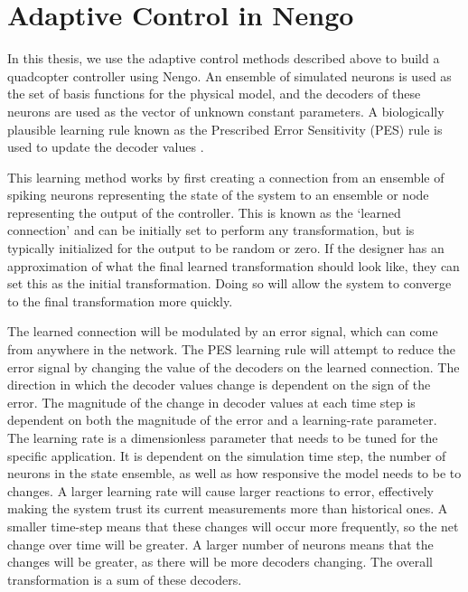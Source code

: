 \documentclass[letterpaper,12pt,titlepage,oneside,final]{book}
\begin{document}
\section{Adaptive Control in Nengo}


In this thesis, we use the adaptive control methods described above to build a quadcopter controller using Nengo. 
An ensemble of simulated neurons is used as the set of basis functions for the physical model, and the decoders of these neurons are used as the vector of unknown constant parameters. 
A biologically plausible learning rule known as the Prescribed Error Sensitivity (PES) rule is used to update the decoder values \cite{bekolay2013simultaneous}. 

This learning method works by first creating a connection from an ensemble of spiking neurons representing the state of the system to an ensemble or node representing the output of the controller. 
This is known as the `learned connection' and can be initially set to perform any transformation, but is typically initialized for the output to be random or zero. 
If the designer has an approximation of what the final learned transformation should look like, they can set this as the initial transformation. 
Doing so will allow the system to converge to the final transformation more quickly.

The learned connection will be modulated by an error signal, which can come from anywhere in the network. 
The PES learning rule will attempt to reduce the error signal by changing the value of the decoders on the learned connection. 
The direction in which the decoder values change is dependent on the sign of the error. 
The magnitude of the change in decoder values at each time step is dependent on both the magnitude of the error and a learning-rate parameter. 
The learning rate is a dimensionless parameter that needs to be tuned for the specific application. 
It is dependent on the simulation time step, the number of neurons in the state ensemble, as well as how responsive the model needs to be to changes. 
A larger learning rate will cause larger reactions to error, effectively making the system trust its current measurements more than historical ones. 
A smaller time-step means that these changes will occur more frequently, so the net change over time will be greater. 
A larger number of neurons means that the changes will be greater, as there will be more decoders changing. The overall transformation is a sum of these decoders. 
\end{document}
